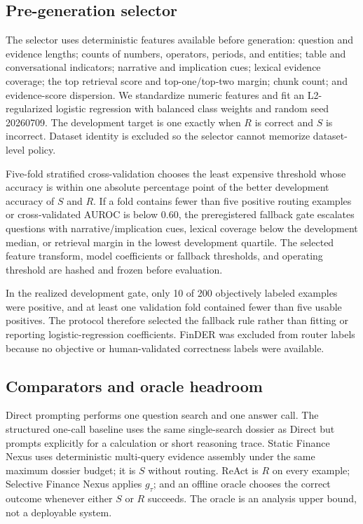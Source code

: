 \subsection{Pre-generation selector}

The selector uses deterministic features available before generation: question and evidence lengths; counts of numbers, operators, periods, and entities; table and conversational indicators; narrative and implication cues; lexical evidence coverage; the top retrieval score and top-one/top-two margin; chunk count; and evidence-score dispersion. We standardize numeric features and fit an L2-regularized logistic regression with balanced class weights and random seed 20260709. The development target is one exactly when $R$ is correct and $S$ is incorrect. Dataset identity is excluded so the selector cannot memorize dataset-level policy.

Five-fold stratified cross-validation chooses the least expensive threshold whose accuracy is within one absolute percentage point of the better development accuracy of $S$ and $R$. If a fold contains fewer than five positive routing examples or cross-validated AUROC is below 0.60, the preregistered fallback gate escalates questions with narrative/implication cues, lexical coverage below the development median, or retrieval margin in the lowest development quartile. The selected feature transform, model coefficients or fallback thresholds, and operating threshold are hashed and frozen before evaluation.

In the realized development gate, only 10 of 200 objectively labeled examples were positive, and at least one validation fold contained fewer than five usable positives. The protocol therefore selected the fallback rule rather than fitting or reporting logistic-regression coefficients. FinDER was excluded from router labels because no objective or human-validated correctness labels were available.

\subsection{Comparators and oracle headroom}

Direct prompting performs one question search and one answer call. The structured one-call baseline uses the same single-search dossier as Direct but prompts explicitly for a calculation or short reasoning trace. Static Finance Nexus uses deterministic multi-query evidence assembly under the same maximum dossier budget; it is $S$ without routing. ReAct is $R$ on every example; Selective Finance Nexus applies $g_\tau$; and an offline oracle chooses the correct outcome whenever either $S$ or $R$ succeeds. The oracle is an analysis upper bound, not a deployable system.

